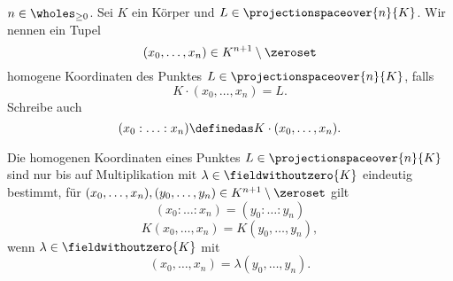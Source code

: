 \begin{definition*}
  \( n\in \wholes_{\geq 0} \). Sei \( K \) ein Körper und \( L\in \projectionspaceover{n}{K} \). Wir nennen ein Tupel
  \begin{equation*}
    (x_0,\dots,x_n)\in K^{n+1}\setminus\zeroset
  \end{equation*}
  homogene Koordinaten des Punktes \( L\in \projectionspaceover{n}{K} \), falls 
  \begin{equation*}
    K\cdot (x_0,\dotsc,x_n)=L.
  \end{equation*}
  Schreibe auch
  \begin{equation*}
    (x_0:\dotsc:x_n)\definedas K\cdot(x_0,\dotsc,x_n).
  \end{equation*}
\end{definition*}
\begin{bemerkung*}
  Die homogenen Koordinaten eines Punktes \( L\in \projectionspaceover{n}{K} \) sind nur bis auf Multiplikation mit \( \lambda\in \fieldwithoutzero{K} \) eindeutig bestimmt, \dh für \( (x_0,\dotsc,x_n),(y_0,\dotsc,y_n)\in K^{n+1}\setminus \zeroset \) gilt
  \begin{equation*}
    (x_0:\dotsc:x_n)=(y_0:\dotsc:y_n)
  \end{equation*}
  \gdw
  \begin{equation*}
    K(x_0,\dotsc,x_n)=K(y_0,\dotsc,y_n),
  \end{equation*}
  \dh wenn \texists  \( \lambda\in \fieldwithoutzero{K} \) mit
  \begin{equation*}
    (x_0,\dotsc,x_n)=\lambda (y_0,\dotsc,y_n).
  \end{equation*}
\end{bemerkung*}
